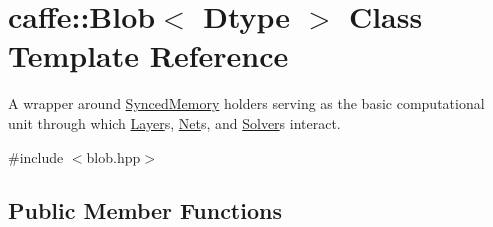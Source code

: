 \hypertarget{classcaffe_1_1Blob}{}\section{caffe\+:\+:Blob$<$ Dtype $>$ Class Template Reference}
\label{classcaffe_1_1Blob}


A wrapper around \hyperlink{classcaffe_1_1SyncedMemory}{Synced\+Memory} holders serving as the basic computational unit through which \hyperlink{classcaffe_1_1Layer}{Layer}s, \hyperlink{classcaffe_1_1Net}{Net}s, and \hyperlink{classcaffe_1_1Solver}{Solver}s interact.  




{\ttfamily \#include $<$blob.\+hpp$>$}

\subsection*{Public Member Functions}
